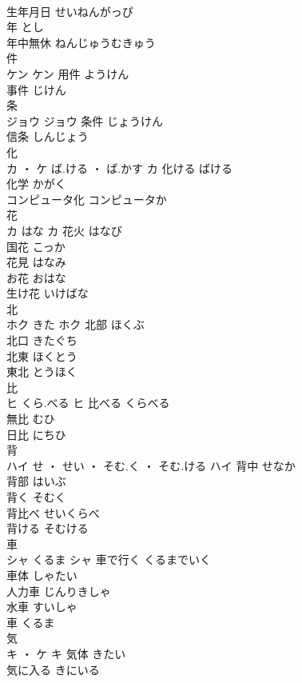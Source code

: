 \documentclass[8pt]{extreport}
\begin{document}
\begin{CJK}{UTF8}{min}
\\	生年月日	せいねんがっぴ	
\\	年	とし	
\\	年中無休	ねんじゅうむきゅう	
\\	件	
\\	ケン		ケン	用件	ようけん	
\\	事件	じけん	
\\	条	
\\	ジョウ		ジョウ	条件	じょうけん	
\\	信条	しんじょう	
\\	化	
\\	カ ・ ケ	ば.ける ・ ば.かす	カ	化ける	ばける	
\\	化学	かがく	
\\	コンピュータ化	コンピュータか	
\\	花	
\\	カ	はな	カ	花火	はなび	
\\	国花	こっか	
\\	花見	はなみ	
\\	お花	おはな	
\\	生け花	いけばな	
\\	北	
\\	ホク	きた	ホク	北部	ほくぶ	
\\	北口	きたぐち	
\\	北東	ほくとう	
\\	東北	とうほく	
\\	比	
\\	ヒ	くら.べる	ヒ	比べる	くらべる	
\\	無比	むひ	
\\	日比	にちひ	
\\	背	
\\	ハイ	せ ・ せい ・ そむ.く ・ そむ.ける	ハイ	背中	せなか	
\\	背部	はいぶ	
\\	背く	そむく	
\\	背比べ	せいくらべ	
\\	背ける	そむける	
\\	車	
\\	シャ	くるま	シャ	車で行く	くるまでいく	
\\	車体	しゃたい	
\\	人力車	じんりきしゃ	
\\	水車	すいしゃ	
\\	車	くるま	
\\	気	
\\	キ ・ ケ		キ	気体	きたい	
\\	気に入る	きにいる	

\end{CJK}
\end{document}
